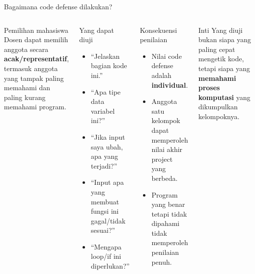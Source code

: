 \documentclass[aspectratio=169,11pt]{beamer}
\begin{document}
\begin{frame}{Bagaimana code defense dilakukan?}
\begin{columns}[T]
\begin{block}{Pemilihan mahasiswa}
\small
Dosen dapat memilih anggota secara \textbf{acak/representatif}, termasuk anggota yang tampak paling memahami dan paling kurang memahami program.
\end{block}
\begin{block}{Yang dapat diuji}
\small
\begin{itemize}
  \item ``Jelaskan bagian kode ini.''
  \item ``Apa tipe data variabel ini?''
  \item ``Jika input saya ubah, apa yang terjadi?''
  \item ``Input apa yang membuat fungsi ini gagal/tidak sesuai?''
  \item ``Mengapa loop/if ini diperlukan?''
\end{itemize}
\end{block}
\begin{block}{Konsekuensi penilaian}
\small
\begin{itemize}
  \item Nilai code defense adalah \textbf{individual}.
  \item Anggota satu kelompok dapat memperoleh nilai akhir project yang berbeda.
  \item Program yang benar tetapi tidak dipahami tidak memperoleh penilaian penuh.
\end{itemize}
\end{block}
\begin{alertblock}{Inti}
\small
Yang diuji bukan siapa yang paling cepat mengetik kode, tetapi siapa yang \textbf{memahami proses komputasi} yang dikumpulkan kelompoknya.
\end{alertblock}
\end{columns}
\end{frame}
\end{document}
